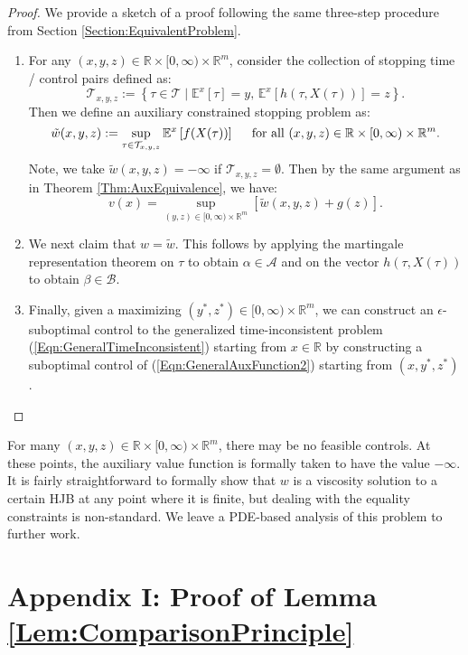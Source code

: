 \documentclass[11pt]{article}
\begin{document}
\begin{proof}
We provide a sketch of a proof following the same three-step procedure from Section \ref{Section:EquivalentProblem}.

\begin{enumerate}
\item For any $(x,y,z)\in\mathbb{R}\times[0,\infty)\times\mathbb{R}^m$, consider the collection of stopping time / control pairs defined as:
\[\mathcal{T}_{x,y,z} := \left\{\tau\in\mathcal{T}\mid \mathbb{E}^x\left[\tau\right] = y,\,\mathbb{E}^x\left[h(\tau,X(\tau))\right]=z\right\}.\]
Then we define an auxiliary constrained stopping problem as:
\[\tilde{w}(x,y,z) := \sup\limits_{\tau\in\mathcal{T}_{x,y,z}} \mathbb{E}^x\left[f(X(\tau))\right]\hspace{0.5cm}\text{for all }(x,y,z)\in\mathbb{R}\times [0,\infty)\times\mathbb{R}^m.\]
Note, we take $\tilde{w}(x,y,z)=-\infty$ if $\mathcal{T}_{x,y,z}=\emptyset$.
Then by the same argument as in Theorem \ref{Thm:AuxEquivalence}, we have:
\[v(x) = \sup\limits_{(y,z)\in[0,\infty)\times\mathbb{R}^m}\left[\tilde{w}(x,y,z)+g(z)\right].\]

\item We next claim that $w=\tilde{w}$. This follows by applying the martingale representation theorem on $\tau$ to obtain $\alpha\in\mathcal{A}$ and on the vector $h(\tau,X(\tau))$ to obtain $\beta\in\mathcal{B}$.

\item Finally, given a maximizing $(y^*,z^*)\in[0,\infty)\times\mathbb{R}^m$, we can construct an $\epsilon$-suboptimal control to the generalized time-inconsistent problem (\ref{Eqn:GeneralTimeInconsistent}) starting from $x\in\mathbb{R}$ by constructing a suboptimal control of (\ref{Eqn:GeneralAuxFunction2}) starting from $(x,y^*,z^*)$.
\end{enumerate}

\end{proof}

For many $(x,y,z)\in\mathbb{R}\times[0,\infty)\times\mathbb{R}^m$, there may be no feasible controls. At these points, the auxiliary value function is formally taken to have the value $-\infty$. It is fairly straightforward to formally show that $w$ is a viscosity solution to a certain HJB at any point where it is finite, but dealing with the equality constraints is non-standard. We leave a PDE-based analysis of this problem to further work.

\section*{Appendix I: Proof of Lemma \ref{Lem:ComparisonPrinciple}}
\end{document}
